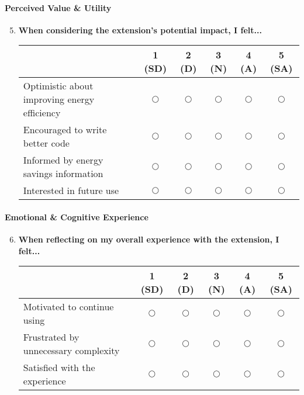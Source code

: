 \documentclass{article}
\begin{document}
\paragraph{Perceived Value \& Utility}
\begin{enumerate}
    \setcounter{enumi}{4}
    \item \textbf{When considering the extension's potential impact, I felt...}
    
    \begin{tabularx}{\textwidth}{|X|c|c|c|c|c|}
        \hline
        & 1 (SD) & 2 (D) & 3 (N) & 4 (A) & 5 (SA) \\
        \hline
        Optimistic about improving energy efficiency & $\bigcirc$ & $\bigcirc$ & $\bigcirc$ & $\bigcirc$ & $\bigcirc$ \\
        \hline
        Encouraged to write better code & $\bigcirc$ & $\bigcirc$ & $\bigcirc$ & $\bigcirc$ & $\bigcirc$ \\
        \hline
        Informed by energy savings information & $\bigcirc$ & $\bigcirc$ & $\bigcirc$ & $\bigcirc$ & $\bigcirc$ \\
        \hline
        Interested in future use & $\bigcirc$ & $\bigcirc$ & $\bigcirc$ & $\bigcirc$ & $\bigcirc$ \\
        \hline
    \end{tabularx}
\end{enumerate}

\paragraph{Emotional \& Cognitive Experience}
\begin{enumerate}
    \setcounter{enumi}{5}
    \item \textbf{When reflecting on my overall experience with the extension, I felt...}
    
    \begin{tabularx}{\textwidth}{|X|c|c|c|c|c|}
        \hline
        & 1 (SD) & 2 (D) & 3 (N) & 4 (A) & 5 (SA) \\
        \hline
        Motivated to continue using & $\bigcirc$ & $\bigcirc$ & $\bigcirc$ & $\bigcirc$ & $\bigcirc$ \\
        \hline
        Frustrated by unnecessary complexity & $\bigcirc$ & $\bigcirc$ & $\bigcirc$ & $\bigcirc$ & $\bigcirc$ \\
        \hline
        Satisfied with the experience & $\bigcirc$ & $\bigcirc$ & $\bigcirc$ & $\bigcirc$ & $\bigcirc$ \\
        \hline
    \end{tabularx}
\end{enumerate}
\end{document}
